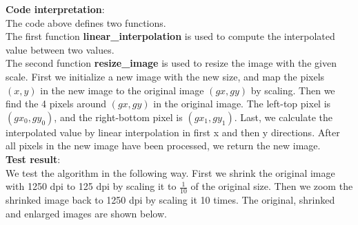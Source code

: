 \documentclass[UTF8]{ctexart}
\begin{document}
\textbf{Code interpretation}:\\
The code above defines two functions.\\
The first function \textbf{linear\_interpolation} is used to compute the interpolated value between two values.\\
The second function \textbf{resize\_image} is used to resize the image with the given scale. First we initialize a new image with the new size,
and map the pixels $(x,y)$ in the new image to the original image $(gx,gy)$ by scaling. Then we find the 4 pixels around $(gx,gy)$ in the original image.
The left-top pixel is $(gx_0,gy_0)$, and the right-bottom pixel is $(gx_1,gy_1)$. Last, we calculate the interpolated value by linear interpolation in first x and then y directions.
After all pixels in the new image have been processed, we return the new image.\\
\textbf{Test result}:\\
We test the algorithm in the following way. First we shrink the original image with 1250 dpi to 125 dpi by scaling it to $\frac{1}{10}$ of the original size.
Then we zoom the shrinked image back to 1250 dpi by scaling it 10 times.
The original, shrinked and enlarged images are shown below.\\
\end{document}
